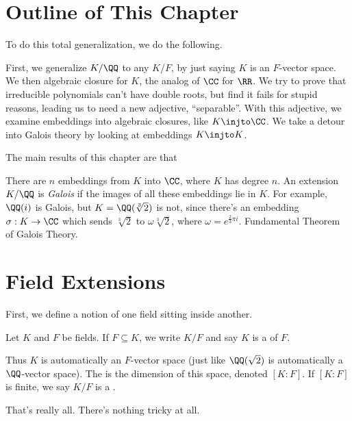 \section{Outline of This Chapter}
To do this total generalization, we do the following.
\begin{itemize}
	\ii First, we generalize $K/\QQ$ to any $K/F$, by just saying $K$ is an $F$-vector space.
	\ii We then algebraic closure for $K$, the analog of $\CC$ for $\RR$.
	\ii We try to prove that irreducible polynomials can't have double roots,
	but find it fails for stupid reasons, leading us to need a new adjective, ``separable''.
	\ii With this adjective, we examine embeddings into algebraic closures, like $K \injto \CC$.
	\ii We take a detour into Galois theory by looking at embeddings $K \injto K$.
\end{itemize}
The main results of this chapter are that
\begin{itemize}
	\ii There are $n$ embeddings from $K$ into $\CC$, where $K$ has degree $n$.
	\ii An extension $K/\QQ$ is \emph{Galois} if the images of all these embeddings lie in $K$.
	For example, $\QQ(i)$ is Galois, but $K = \QQ(\sqrt[3]{2})$ is not, since there's an embedding
	$\sigma : K \to \CC$ which sends $\sqrt[3]{2}$ to $\omega \sqrt[3]{2}$, where $\omega = e^{\frac23 \pi i}$.
	\ii Fundamental Theorem of Galois Theory.
\end{itemize}



\section{Field Extensions}
First, we define a notion of one field sitting inside another.
\begin{definition}
	Let $K$ and $F$ be fields.
	If $F \subseteq K$, we write $K/F$ and say $K$ is a
	 of $F$.
	
	Thus $K$ is automatically an $F$-vector space
	(just like $\QQ(\sqrt 2)$ is automatically a $\QQ$-vector space).
	The  is the dimension of this space, denoted $[K:F]$.
	If $[K:F]$ is finite, we say $K/F$ is a .
\end{definition}
That's really all. There's nothing tricky at all.

